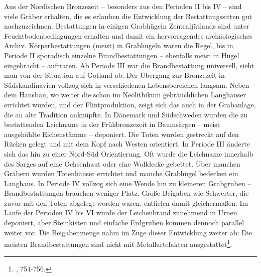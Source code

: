 \documentclass[openany,twoside,twocolumn]{book}
\let\rmarkdownfootnote\footnote%
\def\footnote{\protect\rmarkdownfootnote}
\begin{document}
Aus der Nordischen Bronzezeit -- besonders aus den Perioden II bis IV --
sind viele Gräber erhalten, die es erlauben die Entwicklung der
Bestattungssitten gut nachzuzeichnen. Bestattungen in einigen Grabhügeln
Zentraljütlands sind unter Feuchtbodenbedingungen erhalten und damit ein
hervorragendes archäologisches Archiv. Körperbestattungen (meist) in
Grabhügeln waren die Regel, bis in Periode II sporadisch einzelne
Brandbestattungen -- ebenfalls meist in Hügel eingebracht -- auftraten.
Ab Periode III war die Brandbestattung universell, sieht man von der
Situation auf Gotland ab. Der Übergang zur Bronzezeit in Südskandinavien
vollzog sich in verschiedenen Lebensbereichen langsam. Neben dem
Hausbau, wo weiter die schon im Neolithikum gebräuchlichen Langhäuser
errichtet wurden, und der Flintproduktion, zeigt sich das auch in der
Grabanlage, die an alte Tradition anknüpfte. In Dänemark und Südschweden
wurden die zu bestattenden Leichname in der Frühbronzezeit in Baumsärgen
-- meist ausgehöhlte Eichenstämme -- deponiert. Die Toten wurden
gestreckt auf den Rücken gelegt und mit dem Kopf nach Westen orientiert.
In Periode III änderte sich das hin zu einer Nord-Süd Orientierung. Oft
wurde die Leichname innerhalb des Sarges auf eine Ochsenhaut oder eine
Wolldecke gebettet. Über manchen Gräbern wurden Totenhäuser errichtet
und manche Grabhügel bedecken ein Langhaus. In Periode IV vollzog sich
eine Wende hin zu kleineren Grabgruben -- Brandbestattungen brauchen
weniger Platz. Große Beigaben wie Schwerter, die zuvor mit den Toten
abgelegt worden waren, entfielen damit gleichermaßen. Im Laufe der
Perioden IV bis VI wurde der Leichenbrand zunehmend in Urnen deponiert,
aber Steinkisten und einfache Erdgruben kommen dennoch parallel weiter
vor. Die Beigabenmenge nahm im Zuge dieser Entwicklung weiter ab: Die
meisten Brandbestattungen sind nicht mit Metallartefakten
ausgestattet\footnote{\textcite{thrane_scandinavia_2013}, 754-756.}.
\end{document}
